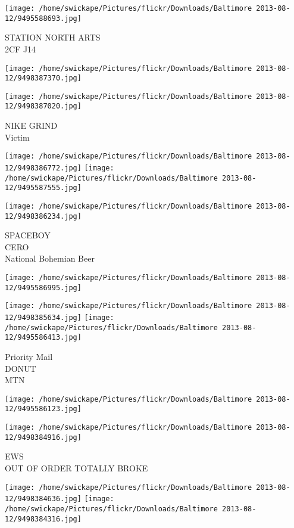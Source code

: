 \documentclass[10pt,letterpaper]{article}
\begin{document}
\vspace{0.25in}
\texttt{[image: /home/swickape/Pictures/flickr/Downloads/Baltimore 2013-08-12/9495588693.jpg]}

STATION NORTH ARTS\\
2CF J14
\pagebreak

\texttt{[image: /home/swickape/Pictures/flickr/Downloads/Baltimore 2013-08-12/9498387370.jpg]}

\vspace{0.25in}
\texttt{[image: /home/swickape/Pictures/flickr/Downloads/Baltimore 2013-08-12/9498387020.jpg]}

NIKE GRIND\\
Victim
\pagebreak

\texttt{[image: /home/swickape/Pictures/flickr/Downloads/Baltimore 2013-08-12/9498386772.jpg]}
\texttt{[image: /home/swickape/Pictures/flickr/Downloads/Baltimore 2013-08-12/9495587555.jpg]}

\vspace{0.25in}
\texttt{[image: /home/swickape/Pictures/flickr/Downloads/Baltimore 2013-08-12/9498386234.jpg]}

SPACEBOY\\
CERO\\
National Bohemian Beer
\pagebreak

\texttt{[image: /home/swickape/Pictures/flickr/Downloads/Baltimore 2013-08-12/9495586995.jpg]}

\vspace{0.25in}
\texttt{[image: /home/swickape/Pictures/flickr/Downloads/Baltimore 2013-08-12/9498385634.jpg]}
\texttt{[image: /home/swickape/Pictures/flickr/Downloads/Baltimore 2013-08-12/9495586413.jpg]}

Priority Mail\\
DONUT\\
MTN
\pagebreak

\texttt{[image: /home/swickape/Pictures/flickr/Downloads/Baltimore 2013-08-12/9495586123.jpg]}

\vspace{0.25in}
\texttt{[image: /home/swickape/Pictures/flickr/Downloads/Baltimore 2013-08-12/9498384916.jpg]}

EWS\\
OUT OF ORDER TOTALLY BROKE
\pagebreak

\texttt{[image: /home/swickape/Pictures/flickr/Downloads/Baltimore 2013-08-12/9498384636.jpg]}
\texttt{[image: /home/swickape/Pictures/flickr/Downloads/Baltimore 2013-08-12/9498384316.jpg]}
\end{document}

